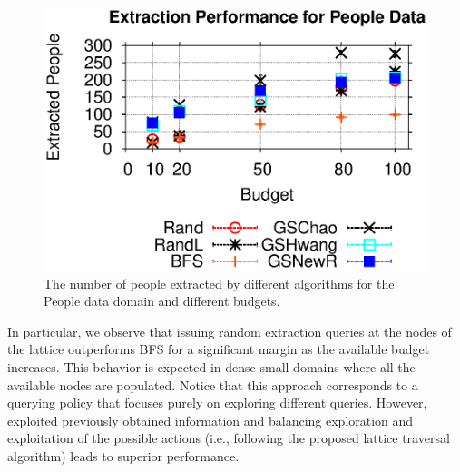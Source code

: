 \documentclass{vldb}
\begin{document}
\vspace{-10pt}\begin{figure}[h]
	\begin{center}
	\includegraphics[clip,scale=0.6]{figs/poExtraction.eps}
	\caption{The number of people extracted by different algorithms for the People data domain and different budgets.}
	\label{fig:poextraction}
	\end{center}
	\vspace{-10pt}
\end{figure}

In particular, we observe that issuing random extraction queries at the nodes of the lattice outperforms BFS for a significant margin as the available budget increases. This behavior is expected in dense small domains where all the available nodes are populated. Notice that this approach corresponds to a querying policy that focuses purely on exploring different queries. However, exploited previously obtained information and balancing exploration and exploitation of the possible actions (i.e., following the proposed lattice traversal algorithm) leads to superior performance. 
\end{document}
